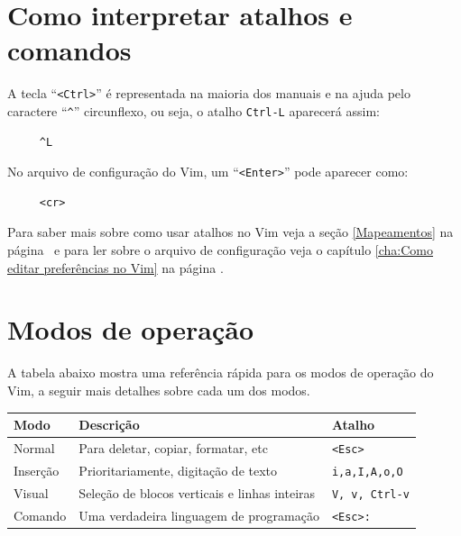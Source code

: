 \section{Como interpretar atalhos e comandos}\label{Como interpretar atalhos e comandos}
%
A tecla ``\verb|<Ctrl>|'' é representada na maioria dos manuais e na ajuda
pelo caractere ``\verb|^|'' circunflexo, ou seja, o atalho \verb|Ctrl-L| aparecerá assim:
\begin{verbatim}
     ^L
\end{verbatim} %

No arquivo de configuração do Vim, um ``\verb|<Enter>|'' pode aparecer como:
\begin{verbatim}
     <cr>
\end{verbatim}

Para saber mais sobre como usar atalhos no Vim
veja a seção \ref{Mapeamentos} na página~\pageref{Mapeamentos} e para ler sobre
o arquivo de configuração veja o capítulo \ref{cha:Como editar preferências no
Vim} na página \pageref{cha:Como editar preferências no Vim}.

\section{Modos de operação}\label{Modos de operação}

A tabela abaixo mostra uma referência rápida para os modos de operação do Vim,
a seguir mais detalhes sobre cada um dos modos. 

\begin{tabular}{|l|l|l|}
\hline
\textbf{Modo} & \textbf{Descrição} & \textbf{Atalho} \tabularnewline
\hline \hline
Normal\index{modo normal} & Para deletar, copiar, formatar, etc & 
                            {\tt <Esc>}\tabularnewline \hline
Inserção\index{modo de inserção} & Prioritariamente, digitação de texto &
                            {}{\tt i,a,I,A,o,O}\tabularnewline \hline
Visual\index{modo visual} & Seleção de blocos verticais e linhas inteiras &
                            {}{\tt V, v, Ctrl-v} \tabularnewline \hline
Comando\index{modo de comando} & Uma verdadeira linguagem de programação &
                            {}{\tt <Esc>:}\tabularnewline \hline
\end{tabular}

